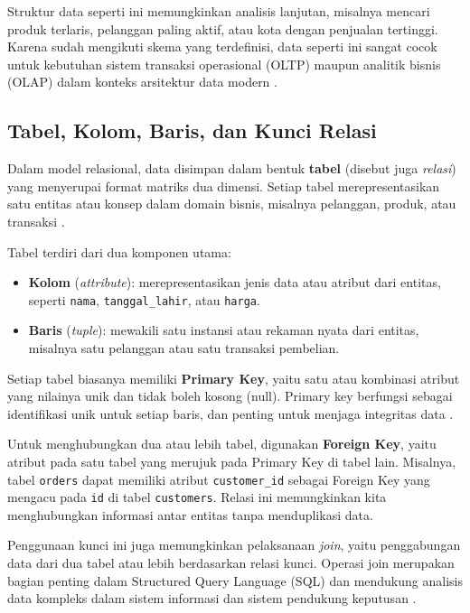 Struktur data seperti ini memungkinkan analisis lanjutan, misalnya mencari produk terlaris, pelanggan paling aktif, atau kota dengan penjualan tertinggi. Karena sudah mengikuti skema yang terdefinisi, data seperti ini sangat cocok untuk kebutuhan sistem transaksi operasional (OLTP) maupun analitik bisnis (OLAP) dalam konteks arsitektur data modern \cite{kimball2013, gartner2023dm}.


\subsection{Tabel, Kolom, Baris, dan Kunci Relasi}

Dalam model relasional, data disimpan dalam bentuk \textbf{tabel} (disebut juga \emph{relasi}) yang menyerupai format matriks dua dimensi. Setiap tabel merepresentasikan satu entitas atau konsep dalam domain bisnis, misalnya pelanggan, produk, atau transaksi \cite{codd1970}.  

Tabel terdiri dari dua komponen utama:

\begin{itemize}
	\item \textbf{Kolom} (\emph{attribute}): merepresentasikan jenis data atau atribut dari entitas, seperti \texttt{nama}, \texttt{tanggal\_lahir}, atau \texttt{harga}.
	\item \textbf{Baris} (\emph{tuple}): mewakili satu instansi atau rekaman nyata dari entitas, misalnya satu pelanggan atau satu transaksi pembelian.
\end{itemize}

Setiap tabel biasanya memiliki \textbf{Primary Key}, yaitu satu atau kombinasi atribut yang nilainya unik dan tidak boleh kosong (null). Primary key berfungsi sebagai identifikasi unik untuk setiap baris, dan penting untuk menjaga integritas data \cite{elmasri2016}.

Untuk menghubungkan dua atau lebih tabel, digunakan \textbf{Foreign Key}, yaitu atribut pada satu tabel yang merujuk pada Primary Key di tabel lain. Misalnya, tabel \texttt{orders} dapat memiliki atribut \texttt{customer\_id} sebagai Foreign Key yang mengacu pada \texttt{id} di tabel \texttt{customers}. Relasi ini memungkinkan kita menghubungkan informasi antar entitas tanpa menduplikasi data.

Penggunaan kunci ini juga memungkinkan pelaksanaan \emph{join}, yaitu penggabungan data dari dua tabel atau lebih berdasarkan relasi kunci. Operasi join merupakan bagian penting dalam Structured Query Language (SQL) dan mendukung analisis data kompleks dalam sistem informasi dan sistem pendukung keputusan \cite{kimball2013}.

